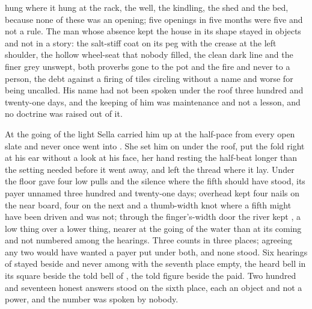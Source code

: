  hung where it hung at the rack, the well, the kindling, the shed and the bed, because none of these was an opening; five openings in five months were five and not a rule. The man whose absence kept the house in its shape stayed in objects and not in a story: the salt-stiff coat on its peg with the crease at the left shoulder, the hollow wheel-seat that nobody filled, the clean dark line and the finer grey unswept, both proverbs gone to the pot and the fire and never to a person, the debt against a firing of tiles circling without a name and worse for being uncalled. His name had not been spoken under the roof three hundred and twenty-one days, and the keeping of him was maintenance and not a lesson, and no doctrine was raised out of it.

At the going of the light Sella carried him up at the half-pace from every open slate and never once went into . She set him on  under the roof, put the fold right at his ear without a look at his face, her hand resting the half-beat longer than the setting needed before it went away, and left the thread where it lay. Under the floor  gave four low pulls and the silence where the fifth should have stood, its payer unnamed three hundred and twenty-one days; overhead  kept four nails on the near board, four on the next and a thumb-width knot where a fifth might have been driven and was not; through the finger's-width door the river kept , a low thing over a lower thing, nearer at the going of the water than at its coming and not numbered among the hearings. Three counts in three places; agreeing any two would have wanted a payer put under both, and none stood. Six hearings of  stayed beside and never among with the seventh place empty, the heard bell in its square beside the told bell of , the told figure beside the paid. Two hundred and seventeen honest answers stood on the sixth place, each an object and not a power, and the number was spoken by nobody.

